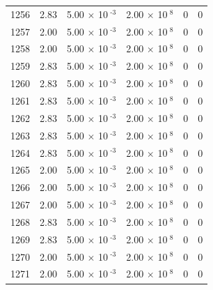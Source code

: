 \documentclass[a4paper,11pt]{article}
\begin{document}
\begin{center}
\begin{longtable}{|R{1.5cm}|R{2.4cm}|R{2.4cm}|R{2.4cm}|R{2.4cm}|R{2.4cm}|}
 1256 &   2.83  &         5.00 $\times$ 10$^{\text{          -3}}$  &         2.00 $\times$ 10$^{\text{           8}}$  & 0  & 0 \\
 1257 &   2.00  &         5.00 $\times$ 10$^{\text{          -3}}$  &         2.00 $\times$ 10$^{\text{           8}}$  & 0  & 0 \\
 1258 &   2.00  &         5.00 $\times$ 10$^{\text{          -3}}$  &         2.00 $\times$ 10$^{\text{           8}}$  & 0  & 0 \\
 1259 &   2.83  &         5.00 $\times$ 10$^{\text{          -3}}$  &         2.00 $\times$ 10$^{\text{           8}}$  & 0  & 0 \\
 1260 &   2.83  &         5.00 $\times$ 10$^{\text{          -3}}$  &         2.00 $\times$ 10$^{\text{           8}}$  & 0  & 0 \\
 1261 &   2.83  &         5.00 $\times$ 10$^{\text{          -3}}$  &         2.00 $\times$ 10$^{\text{           8}}$  & 0  & 0 \\
 1262 &   2.83  &         5.00 $\times$ 10$^{\text{          -3}}$  &         2.00 $\times$ 10$^{\text{           8}}$  & 0  & 0 \\
 1263 &   2.83  &         5.00 $\times$ 10$^{\text{          -3}}$  &         2.00 $\times$ 10$^{\text{           8}}$  & 0  & 0 \\
 1264 &   2.83  &         5.00 $\times$ 10$^{\text{          -3}}$  &         2.00 $\times$ 10$^{\text{           8}}$  & 0  & 0 \\
 1265 &   2.00  &         5.00 $\times$ 10$^{\text{          -3}}$  &         2.00 $\times$ 10$^{\text{           8}}$  & 0  & 0 \\
 1266 &   2.00  &         5.00 $\times$ 10$^{\text{          -3}}$  &         2.00 $\times$ 10$^{\text{           8}}$  & 0  & 0 \\
 1267 &   2.00  &         5.00 $\times$ 10$^{\text{          -3}}$  &         2.00 $\times$ 10$^{\text{           8}}$  & 0  & 0 \\
 1268 &   2.83  &         5.00 $\times$ 10$^{\text{          -3}}$  &         2.00 $\times$ 10$^{\text{           8}}$  & 0  & 0 \\
 1269 &   2.83  &         5.00 $\times$ 10$^{\text{          -3}}$  &         2.00 $\times$ 10$^{\text{           8}}$  & 0  & 0 \\
 1270 &   2.00  &         5.00 $\times$ 10$^{\text{          -3}}$  &         2.00 $\times$ 10$^{\text{           8}}$  & 0  & 0 \\
 1271 &   2.00  &         5.00 $\times$ 10$^{\text{          -3}}$  &         2.00 $\times$ 10$^{\text{           8}}$  & 0  & 0 \\

\end{longtable}
\end{center}
\end{document}
